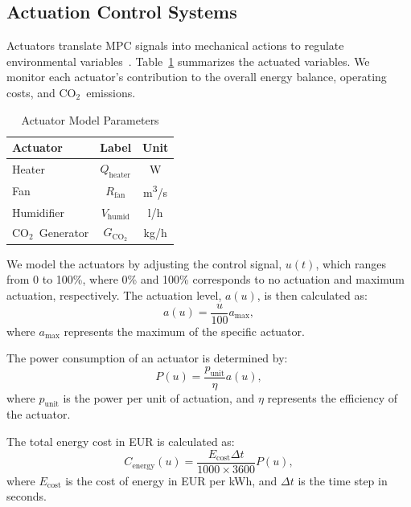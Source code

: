 \documentclass[conference]{IEEEtran}
\newcommand{\coo}{\ensuremath{\mathrm{CO_2}}}
\begin{document}
\subsection{Actuation Control Systems}
Actuators translate MPC signals into mechanical actions to regulate environmental variables~\cite{Butterfield2018}. Table~\ref{tab:actuators} summarizes the actuated variables. We monitor each actuator's contribution to the overall energy balance, operating costs, and \coo\ emissions.
\begin{table}
    \centering
    \caption{Actuator Model Parameters}\label{tab:actuators}
    \begin{tabular}{lcc}
        \toprule
        Actuator        & Label                   & Unit                   \\
        \midrule
        Heater          & \( Q_{\text{heater}} \) & W                      \\
        Fan             & \( R_{\text{fan}} \)    & m\textsuperscript{3}/s \\
        Humidifier      & \( V_{\text{humid}} \)  & l/h                    \\
        \coo\ Generator & \( G_{\coo} \)          & kg/h                   \\
        \bottomrule
    \end{tabular}
\end{table}
We model the actuators by adjusting the control signal, \( u(t) \), which ranges from 0 to 100\%, where 0\% and 100\% corresponds to no actuation and maximum actuation, respectively. The actuation level, \( a(u) \), is then calculated as:
\begin{equation}
    a(u) = \frac{u}{100}  a_{\text{max}},
\end{equation}
where \( a_{\text{max}} \) represents the maximum of the specific actuator.

The power consumption of an actuator is determined by:
\begin{equation}
    P(u) = \frac{p_{\text{unit}}}{\eta}  a(u),
\end{equation}
where \( p_{\text{unit}} \) is the power per unit of actuation, and \( \eta \) represents the efficiency of the actuator.

The total energy cost in EUR is calculated as:
\begin{equation}
    C_{\text{energy}}(u) = \frac{E_{\text{cost}}  \Delta t}{1000 \times 3600}  P(u),
\end{equation}
where \( E_{\text{cost}} \) is the cost of energy in EUR per kWh, and \( \Delta t \) is the time step in seconds.
\end{document}
